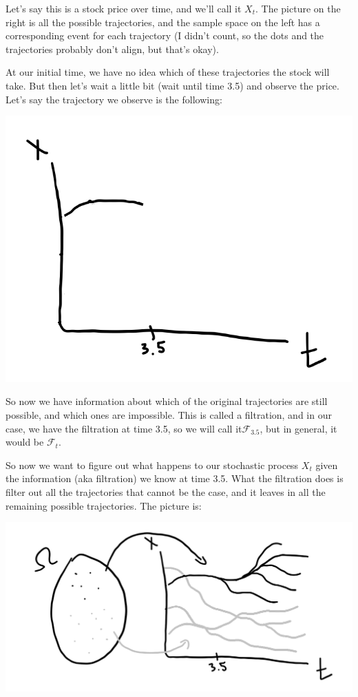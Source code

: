 \documentclass{article}
\begin{document}
Let's say this is a stock price over time, and we'll call it $X_t$.  The picture on the right is all the possible trajectories, and the sample space on the left has a corresponding event for each trajectory (I didn't count, so the dots and the trajectories probably don't align, but that's okay).

At our initial time, we have no idea which of these trajectories the stock will take.  But then let's wait a little bit (wait until time 3.5) and observe the price.  Let's say the trajectory we observe is the following:

\includegraphics[width=\textwidth]{filtration_part_2.png}

So now we have information about which of the original trajectories are still possible, and which ones are impossible. This is called a filtration, and in our case, we have the filtration at time 3.5, so we will call it$\mathcal{F}_{3.5}$, but in general, it would be $\mathcal{F}_{t}$.

So now we want to figure out what happens to our stochastic process $X_t$ given the information (aka filtration) we know at time 3.5. What the filtration does is filter out all the trajectories that cannot be the case, and it leaves in all the remaining possible trajectories.  The picture is:

\includegraphics[width=\textwidth]{filtration_part_3.png}
\end{document}

